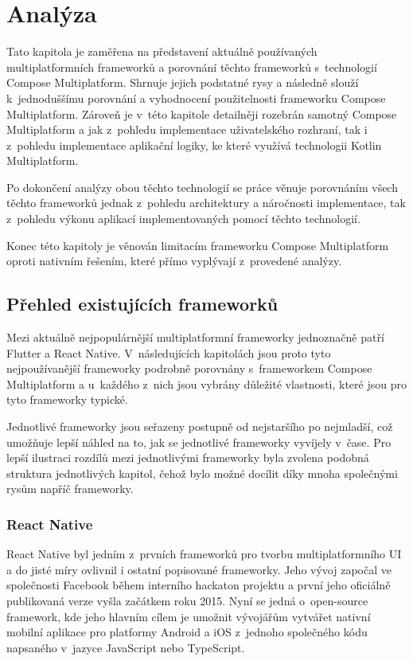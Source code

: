 \chapter{Analýza}
Tato kapitola je zaměřena na představení aktuálně používaných multiplatformních frameworků a porovnání těchto frameworků
s~technologií Compose Multiplatform. Shrnuje jejich podstatné rysy a následně slouží
k~jednoduššímu porovnání a vyhodnocení použitelnosti frameworku Compose Multiplatform. Zároveň je v~této kapitole detailněji
rozebrán samotný Compose Multiplatform a jak z~pohledu implementace uživatelského rozhraní, tak i z~pohledu implementace
aplikační logiky, ke které využívá technologii Kotlin Multiplatform.

Po dokončení analýzy obou těchto technologií se práce věnuje porovnáním všech těchto frameworků jednak z~pohledu architektury
a náročnosti implementace, tak z~pohledu výkonu aplikací implementovaných pomocí těchto technologií. 

Konec této kapitoly je věnován limitacím frameworku Compose Multiplatform oproti nativním řešením, které přímo vyplývají 
z~provedené analýzy.  


\section{Přehled existujících frameworků}
Mezi aktuálně nejpopulárnější multiplatformní frameworky jednoznačně patří Flutter a React Native. \cite{crossPlatformFrameworksStats}
V~následujících kapitolách jsou proto tyto nejpoužívanější frameworky podrobně porovnány s~frameworkem Compose Multiplatform a u~každého z~nich 
jsou vybrány důležité vlastnosti, které jsou pro tyto frameworky typické. 

Jednotlivé frameworky jsou seřazeny postupně od nejstaršího
po nejmladší, což umožňuje lepší náhled na to, jak se jednotlivé frameworky vyvíjely v~čase. Pro lepší ilustraci rozdílů 
mezi jednotlivými frameworky byla zvolena 
podobná struktura jednotlivých kapitol, čehož bylo možné docílit díky mnoha společnými rysům napříč frameworky.

\subsection{React Native}
React Native byl jedním z~prvních frameworků pro tvorbu multiplatformního UI a do jisté míry ovlivnil i ostatní popisované
frameworky. Jeho vývoj započal ve společnosti Facebook během interního hackaton projektu a první jeho oficiálně publikovaná
verze vyšla začátkem roku 2015. \cite{reactNativeHistory}
Nyní se jedná o~open-source framework, kde jeho hlavním cílem je umožnit vývojářům vytvářet nativní mobilní aplikace 
pro platformy Android a iOS z~jednoho společného kódu napsaného v~jazyce JavaScript nebo TypeScript.

